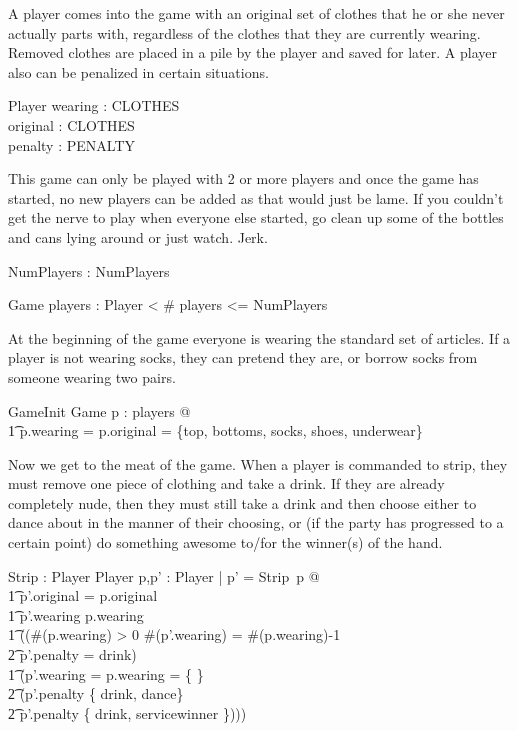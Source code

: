 \documentclass[11pt]{article}
\begin{document}
A player comes into the game with an original set of clothes that he or she never actually parts
with, regardless of the clothes that they are currently wearing.  Removed clothes are placed in a
pile by the player and saved for later.  A player also can be penalized in certain situations.
\begin{schema}{Player}
  wearing : CLOTHES \\
  original : CLOTHES \\
  penalty : PENALTY
\end{schema}

This game can only be played with 2 or more players and once the game has started, no new players
can be added as that would just be lame.  If you couldn't get the nerve to play when everyone else
started, go clean up some of the bottles and cans lying around or just watch.  Jerk.
\begin{axdef}
  NumPlayers : \nat
  \where
  NumPlayers 
\end{axdef}

\begin{schema}{Game}
  players : \seq Player
   < \# players <= NumPlayers
\end{schema}

At the beginning of the game everyone is wearing the standard set of articles.  If a player is not
wearing socks, they can pretend they are, or borrow socks from someone wearing two pairs.
\begin{schema}{GameInit}
  Game
  \where
  \forall p : \ran players @ \\
  \t1 p.wearing = p.original = \{top, bottoms, socks, shoes, underwear\}
\end{schema}

Now we get to the meat of the game.  When a player is commanded to strip, they must remove one piece
of clothing and take a drink.  If they are already completely nude, then they must still take a
drink and then choose either to dance about in the manner of their choosing, or (if the party has
progressed to a certain point) do something awesome to/for the winner(s) of the hand.
\begin{axdef}
  Strip : Player \rel Player
  \where
  \forall p,p' : Player | p' = Strip~p @ \\
  \t1 p'.original = p.original \land \\
  \t1 p'.wearing \subseteq p.wearing \land \\
  \t1 ((\#(p.wearing) > 0 \land \#(p'.wearing) = \#(p.wearing)-1 \land \\
  \t2 p'.penalty = drink) \lor \\
  \t1  (p'.wearing = p.wearing = \{ \} \land \\
  \t2 (p'.penalty \in \{ drink, dance\} \lor \\
  \t2 p'.penalty \in \{ drink, servicewinner \})))
\end{axdef}
\end{document}
